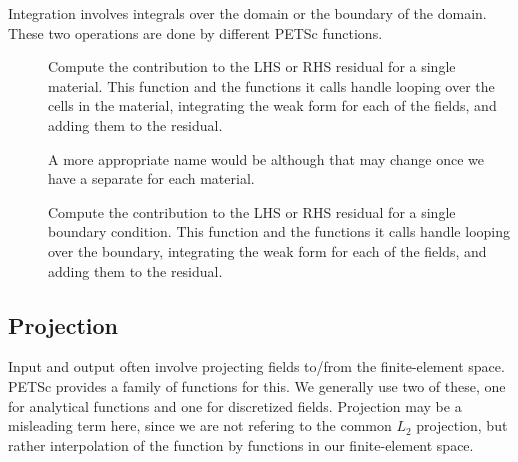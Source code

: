 Integration involves integrals over the domain or the boundary of the
domain. These two operations are done by different PETSc functions.

\begin{description}
\item[] Compute the
  contribution to the LHS or RHS residual for a single material. This
  function and the functions it calls handle looping over the cells in
  the material, integrating the weak form for each of the fields, and
  adding them to the residual.

  A more appropriate name would be
   although that may change once
  we have a separate  for each material.
%
\item[] Compute the contribution
  to the LHS or RHS residual for a single boundary condition. This
  function and the functions it calls handle looping over the
  boundary, integrating the weak form for each of the fields, and
  adding them to the residual.
\end{description}

\subsection{Projection}

Input and output often involve projecting fields to/from the
finite-element space. PETSc provides a family of functions for
this. We generally use two of these, one for analytical functions and
one for discretized fields. Projection may be a misleading term here,
since we are not refering to the common $L_2$ projection, but rather
interpolation of the function by functions in our finite-element
space.

